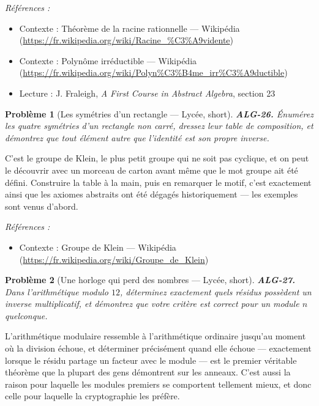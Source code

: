\documentclass[11pt]{article}
\newtheorem{problem}{Problème}
\newenvironment{refs}{\par\small\noindent\emph{Références :}\begin{itemize}\setlength\itemsep{0pt}}{\end{itemize}\normalsize}
\begin{document}
\begin{refs}
\item Contexte : Théorème de la racine rationnelle --- Wikipédia (\url{https://fr.wikipedia.org/wiki/Racine_%C3%A9vidente})
\item Contexte : Polynôme irréductible --- Wikipédia (\url{https://fr.wikipedia.org/wiki/Polyn%C3%B4me_irr%C3%A9ductible})
\item Lecture : J. Fraleigh, \textit{A First Course in Abstract Algebra}, section 23
\end{refs}

\bigskip

\begin{problem}[{Les symétries d'un rectangle --- Lycée, short}]
\textbf{ALG-26.} Énumérez les quatre symétries d'un rectangle non carré, dressez leur table de composition, et démontrez que tout élément autre que l'identité est son propre inverse.
\end{problem}

\noindent C'est le groupe de Klein, le plus petit groupe qui ne soit pas cyclique, et on peut le découvrir avec un morceau de carton avant même que le mot \og{} groupe \fg{} ait été défini. Construire la table à la main, puis en remarquer le motif, c'est exactement ainsi que les axiomes abstraits ont été dégagés historiquement --- les exemples sont venus d'abord.

\begin{refs}
\item Contexte : Groupe de Klein --- Wikipédia (\url{https://fr.wikipedia.org/wiki/Groupe_de_Klein})
\end{refs}

\bigskip

\begin{problem}[{Une horloge qui perd des nombres --- Lycée, short}]
\textbf{ALG-27.} Dans l'arithmétique modulo $ 12 $, déterminez exactement quels résidus possèdent un inverse multiplicatif, et démontrez que votre critère est correct pour un module $ n $ quelconque.
\end{problem}

\noindent L'arithmétique modulaire ressemble à l'arithmétique ordinaire jusqu'au moment où la division échoue, et déterminer précisément quand elle échoue --- exactement lorsque le résidu partage un facteur avec le module --- est le premier véritable théorème que la plupart des gens démontrent sur les anneaux. C'est aussi la raison pour laquelle les modules premiers se comportent tellement mieux, et donc celle pour laquelle la cryptographie les préfère.
\end{document}
